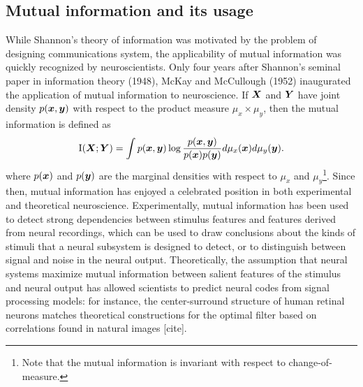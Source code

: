 \documentclass[12pt]{article}
\begin{document}
\subsection{Mutual information and its usage}\label{sec:background_mi}
While Shannon's theory of information was motivated by the problem of
designing communications system, the applicability of mutual
information was quickly recognized by neuroscientists.  Only four
years after Shannon's seminal paper in information theory (1948),
McKay and McCullough (1952) inaugurated the application of mutual
information to neuroscience.  If $\boldsymbol{X}$ and $\boldsymbol{Y}$ have joint density
$p(\boldsymbol{x}, \boldsymbol{y})$ with respect to the product measure $\mu_x \times \mu_y$, then the mutual information is defined as
\[
\text{I}(\boldsymbol{X};\boldsymbol{Y}) = \int p(\boldsymbol{x}, \boldsymbol{y}) \log \frac{p(\boldsymbol{x}, \boldsymbol{y})}{p(\boldsymbol{x})p(\boldsymbol{y})}d\mu_x(\boldsymbol{x}) d\mu_y(\boldsymbol{y}).
\]
where $p(\boldsymbol{x})$ and $p(\boldsymbol{y})$ are the marginal densities with respect to
$\mu_x$ and $\mu_y$\footnote{Note that the mutual information is invariant with respect to change-of-measure.}.  Since then, mutual information has enjoyed a
celebrated position in both experimental and theoretical neuroscience.
Experimentally, mutual information has been used to detect strong
dependencies between stimulus features and features derived from
neural recordings, which can be used to draw conclusions about the
kinds of stimuli that a neural subsystem is designed to detect, or to
distinguish between signal and noise in the neural output.
Theoretically, the assumption that neural systems maximize mutual
information between salient features of the stimulus and neural output
has allowed scientists to predict neural codes from signal processing
models: for instance, the center-surround structure of human retinal
neurons matches theoretical constructions for the optimal filter based
on correlations found in natural images [cite].
\end{document}
